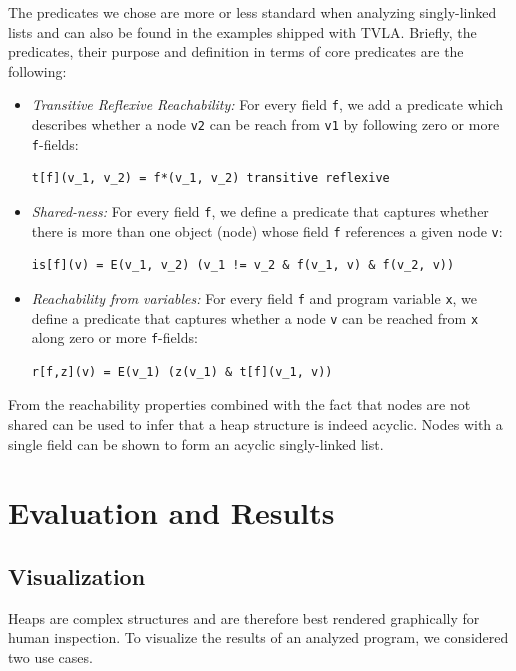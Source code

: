 \documentclass[11pt,a4paper,english]{article}
\begin{document}
The predicates we chose are more or less standard when analyzing singly-linked
lists and can also be found in the examples shipped with TVLA. Briefly, the
predicates, their purpose and definition in terms of core predicates are the following:
\begin{itemize}
  \item \emph{Transitive Reflexive Reachability: } For every field \texttt{f},
    we add a predicate which describes whether a node \texttt{v2} can be reach
    from \texttt{v1} by following zero or more \texttt{f}-fields:
\begin{lstlisting}[language=TVP,frame=none,numbers=none]
  t[f](v_1, v_2) = f*(v_1, v_2) transitive reflexive
\end{lstlisting}
  \item \emph{Shared-ness: } For every field \texttt{f}, we define a
    predicate that captures whether there is more than one object (node)
    whose field \texttt{f} references a given node \texttt{v}:
\begin{lstlisting}[frame=none,numbers=none]
  is[f](v) = E(v_1, v_2) (v_1 != v_2 & f(v_1, v) & f(v_2, v))
\end{lstlisting}
  \item \emph{Reachability from variables: } For every field \texttt{f} and
    program variable \texttt{x},  we define a predicate that captures whether
    a node \texttt{v} can be reached from \texttt{x} along zero or more
    \texttt{f}-fields:
\begin{lstlisting}[frame=none,numbers=none]
  r[f,z](v) = E(v_1) (z(v_1) & t[f](v_1, v))  
\end{lstlisting}
\end{itemize}

From the reachability properties combined with the fact that nodes are not
shared can be used to infer that a heap structure is indeed acyclic. Nodes with
a single field can be shown to form an acyclic singly-linked list.
\clearpage
\pagebreak
\section{Evaluation and Results}
 
\subsection{Visualization}   
\label{sct:visualization}
Heaps are complex structures and are therefore best rendered graphically for
human inspection. To visualize the results of an analyzed program, we considered
two use cases.
\end{document}
